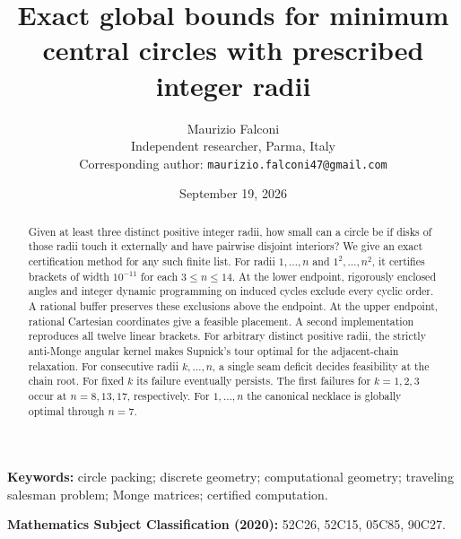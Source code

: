 \documentclass[11pt]{article}
\title{Exact global bounds for minimum central circles with prescribed integer radii}
\author{Maurizio Falconi\\[3pt]\small Independent researcher, Parma, Italy\\
\small Corresponding author: \texttt{maurizio.falconi47@gmail.com}}
\date{September 19, 2026}
\theoremstyle{definition}
\theoremstyle{remark}
\begin{document}
\maketitle

\begin{abstract}
Given at least three distinct positive integer radii, how small can a circle
be if disks of those radii touch it externally and have pairwise disjoint
interiors? We give an exact certification method for any such finite list.
For radii $1,\ldots,n$ and $1^2,\ldots,n^2$, it certifies brackets of
width $10^{-11}$ for each $3\le n\le14$. At the lower endpoint, rigorously
enclosed angles and integer dynamic programming on induced cycles exclude
every cyclic order. A rational buffer preserves these exclusions above
the endpoint. At the upper endpoint, rational Cartesian coordinates give
a feasible placement. A second implementation reproduces all twelve linear
brackets. For arbitrary distinct positive radii, the strictly anti-Monge
angular kernel makes Supnick's tour optimal for the adjacent-chain
relaxation. For consecutive radii $k,\ldots,n$, a single seam deficit
decides feasibility at the chain root. For fixed $k$ its failure eventually
persists. The first failures for $k=1,2,3$ occur at $n=8,13,17$,
respectively. For $1,\ldots,n$ the canonical necklace is globally optimal
through $n=7$.
\end{abstract}

\noindent\textbf{Keywords:} circle packing; discrete geometry; computational
geometry; traveling salesman problem; Monge matrices; certified computation.

\medskip\noindent\textbf{Mathematics Subject Classification (2020):}
52C26, 52C15, 05C85, 90C27.
\end{document}
